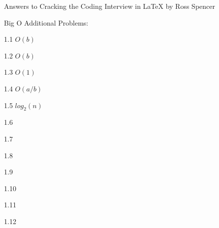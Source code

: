 \documentclass{article}
\begin{document}
Answers to Cracking the Coding Interview in \LaTeX
by Ross Spencer


Big O Additional Problems:

1.1 $O(b)$

1.2 $O(b)$

1.3 $O(1)$

1.4 $O(a/b)$

1.5 $log_{2}(n)$

1.6 

1.7 

1.8

1.9

1.10

1.11

1.12
\end{document}
